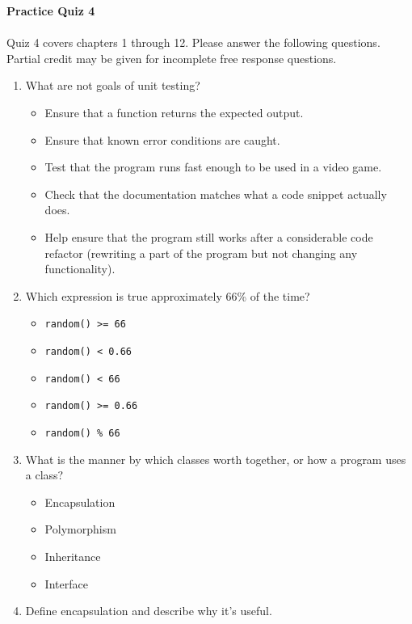 \documentclass[letter,10pt]{article}
\begin{document}
\huge
\textbf{Practice Quiz 4}
\normalsize

\paragraph{}Quiz 4 covers chapters 1 through 12. Please answer the following questions. Partial credit may be given for incomplete free response questions.

\begin{enumerate}
    \item What are not goals of unit testing?
    \begin{itemize}
        \item Ensure that a function returns the expected output.
        \item Ensure that known error conditions are caught.
        \item Test that the program runs fast enough to be used in a video game.
        \item Check that the documentation matches what a code snippet actually does.
        \item Help ensure that the program still works after a considerable code refactor (rewriting a part of the program but not changing any functionality).
    \end{itemize}

    \item Which expression is true approximately 66\% of the time?
    \begin{itemize}
        \item \verb|random() >= 66|
        \item \verb|random() < 0.66|
        \item \verb|random() < 66|
        \item \verb|random() >= 0.66|
        \item \verb|random() % 66|
    \end{itemize}
    
    \item What is the manner by which classes worth together, or how a program uses a class?
    \begin{itemize}
    	\item Encapsulation
	\item Polymorphism
	\item Inheritance
	\item Interface
    \end{itemize}
    
    \item Define encapsulation and describe why it's useful.
    

\end{enumerate}
\end{document}
